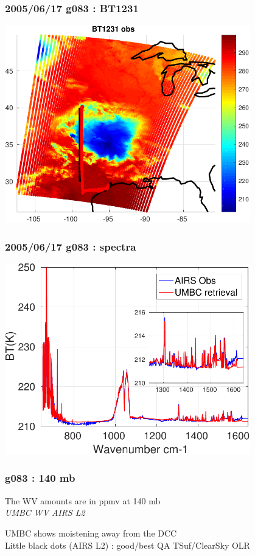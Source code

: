 \documentclass[10pt,t]{beamer}
\begin{document}
\begin{frame}
\frametitle{2005/06/17 g083 : BT1231}

  \begin{center}
    \noindent\includegraphics[width=0.8\textwidth]{Figs/FigsDCC/bt1231obs_2005_06_17_g083_vers04.pdf}
  \end{center}
\end{frame}

\begin{frame}
\frametitle{2005/06/17 g083 : spectra}
  \begin{center}
    \noindent\includegraphics[width=0.8\textwidth]{Figs/FigsDCC/dcc_spectra_2005_06_17.pdf}
  \end{center}
\end{frame}

\begin{frame}
\frametitle{g083 : 140 mb}
The WV amounts are in ppmv at 140 mb\\
\hspace{0.5in} \emph{UMBC WV}  \hspace{2.0in} \emph{AIRS L2} \\
\begin{center}
\end{center}
UMBC shows moistening away from the DCC \\
Little black dots (AIRS L2) : good/best QA TSuf/ClearSky OLR
\end{frame}
\end{document}
